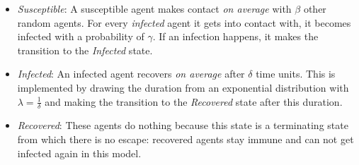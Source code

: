 \begin{itemize}
	\item \textit{Susceptible}: A susceptible agent makes contact \textit{on average} with $\beta$ other random agents. For every \textit{infected} agent it gets into contact with, it becomes infected with a probability of $\gamma$. If an infection happens, it makes the transition to the \textit{Infected} state.

	\item \textit{Infected}: An infected agent recovers \textit{on average} after $\delta$ time units. This is implemented by drawing the duration from an exponential distribution \cite{borshchev_system_2004} with $\lambda = \frac{1}{\delta}$ and making the transition to the \textit{Recovered} state after this duration.

	\item \textit{Recovered}: These agents do nothing because this state is a terminating state from which there is no escape: recovered agents stay immune and can not get infected again in this model. 
\end{itemize}
